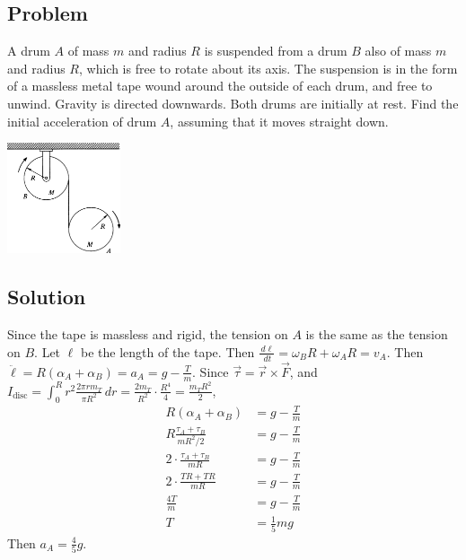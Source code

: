 \documentclass[solutions]{esg8012pset}
\renewcommand{\d}{\,d}
\begin{document}
\subsection{Problem}
  A drum $A$ of mass $m$ and radius $R$ is suspended from a drum $B$ also of mass $m$ and radius $R$, which is free to rotate about its axis. The suspension is in the form of a massless metal tape wound around the outside of each drum, and free to unwind. Gravity is directed downwards. Both drums are initially at rest. Find the initial acceleration of drum $A$, assuming that it moves straight down.
  \begin{center}\includegraphics[width=0.25\textwidth]{ps09_3}\end{center}
\subsection{Solution}

  Since the tape is massless and rigid, the tension on $A$ is the same as the tension on $B$.  Let $\ell$ be the length of the tape.  Then $\frac{\d \ell}{\d t} = \omega_B R + \omega_A R = v_A$.  Then $\ddot \ell = R (\alpha_A + \alpha_B) = a_A = g - \frac{T}{m}$.  Since $\vec \tau = \vec r \times \vec F$, and $I_{\text{disc}} = \int_0^R r^2 \frac{2\pi r m_T}{\pi R^2} \d r = \frac{2 m_T}{R^2} \cdot \frac{R^4}{4} = \frac{m_T R^2}{2}$, \begin{align*}
  R (\alpha_A + \alpha_B) & = g - \frac{T}{m} \\
  R \frac{\tau_A + \tau_B}{m R^2 / 2} & = g - \frac{T}{m} \\
  2\cdot \frac{\tau_A + \tau_B}{m R} & = g - \frac{T}{m} \\
  2\cdot \frac{T R + T R}{m R} & = g - \frac{T}{m} \\
  \frac{4T}{m} & = g - \frac{T}{m} \\
  T & = \frac{1}{5}m g
  \end{align*}  Then $a_A = \frac{4}{5}g$.
\end{document}
